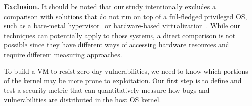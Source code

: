 \noindent
\textbf{Exclusion.}
It should be noted that our study intentionally excludes %
a comparison with solutions that do not run on top of a 
full-fledged privileged OS, such as 
a bare-metal hypervisor~\cite{Xen-03, VMWare-Server} or 
hardware-based virtualization~\cite{IntelVT, keller2010nohype}. 
While our techniques can potentially apply to those 
systems, a direct comparison is not possible since they have different 
ways of accessing hardware resources and require different measuring approaches. 

To build a VM to resist zero-day vulnerabilities, we need to know which
portions of the kernel may be more prone to exploitation. Our first step is to
define and test a security metric that can quantitatively measure how bugs and
vulnerabilities are distributed in the host OS kernel.
